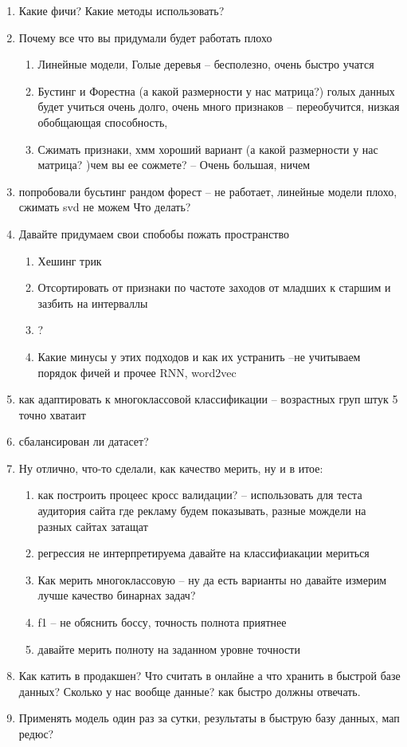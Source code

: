 \documentclass[a4paper, 12pt]{article}
\begin{document}
\begin{enumerate}
\begin{enumerate}
	\item Какие фичи? Какие методы использовать? 
	\item Почему все что вы придумали будет работать плохо
	\begin{enumerate}
		\item Линейные модели, Голые деревья -- бесполезно, очень быстро учатся
		\item Бустинг и Форестна  (а какой размерности у нас матрица?) голых данных будет учиться очень долго, очень много признаков -- переобучится, низкая обобщающая способность,
		\item Сжимать признаки, хмм хороший вариант (а какой размерности у нас матрица? )чем вы ее сожмете? -- Очень большая, ничем
	\end{enumerate}
	\item попробовали бусьтинг рандом форест -- не работает, линейные модели плохо, сжимать svd не можем Что делать?
	\item Давайте придумаем свои спобобы пожать пространство 
		\begin{enumerate}
			\item Хешинг трик
			\item Отсортировать от признаки по частоте заходов от младших к старшим и зазбить на интерваллы
			\item ?
			\item Какие минусы у этих подходов и как их устранить --не учитываем порядок фичей и прочее RNN, word2vec
		\end{enumerate}
	\item как адаптировать к многоклассовой классификации -- возрастных груп штук 5 точно хватаит
	\item сбалансирован ли датасет?
	\item Ну отлично, что-то сделали, как качество мерить, ну и в итое:
	\begin{enumerate}
		\item как построить процеес кросс валидации? -- использовать для теста аудитория сайта где рекламу будем показывать, разные мождели на разных сайтах затащат
		\item регрессия не интерпретируема давайте на классифиакации мериться 
		\item Как мерить многоклассовую -- ну да есть варианты но давайте измерим лучше качество бинарнах задач?
		\item f1 -- не обяснить боссу, точность полнота приятнее 
		\item давайте мерить полноту на заданном уровне точности
	\end{enumerate}
	\item Как катить в продакшен? Что считать в онлайне а что хранить в быстрой базе данных? Сколько у нас вообще данные? как быстро должны отвечать.
	\item Применять модель один раз за сутки, результаты в быструю базу данных, мап редюс?
	\end{enumerate}
\end{enumerate}

	
\end{document}
